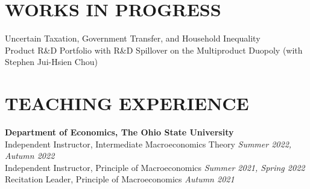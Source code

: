 \documentclass[10pt]{res} %
\begin{document}
\begin{resume}
\vspace{-10pt}

\section{WORKS IN PROGRESS}%
\label{sec:works_in_progress}
Uncertain Taxation, Government Transfer, and Household Inequality \\
Product R\&D Portfolio with R\&D Spillover on the Multiproduct Duopoly (with Stephen Jui-Hsien Chou) \\
\vspace{-10pt}

\section{TEACHING EXPERIENCE}%
\label{sec:teaching_experience}

\vspace{8pt} %

{\bf Department of Economics, The Ohio State University} \\
Independent Instructor, Intermediate Macroeconomics Theory \hfill \textit{Summer 2022, Autumn 2022} \\
Independent Instructor, Principle of Macroeconomics \hfill  \textit{Summer 2021, Spring 2022} \\
Recitation Leader, Principle of Macroeconomics \hfill  \textit{Autumn 2021}





\end{resume}
\end{document}
